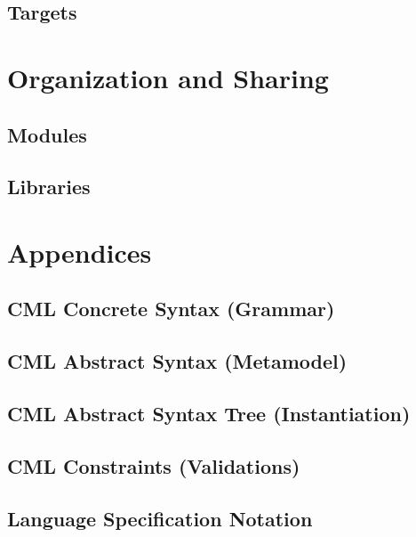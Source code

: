 \documentclass[a4paper,oneside,12pt, extrafontsizes]{memoir}
\theoremstyle{definition}
\theoremstyle{definition}
\theoremstyle{definition}
\theoremstyle{definition}
\begin{document}
\chapter{Targets}
\label{sec:targets}

\part{Organization and Sharing}

\chapter{Modules}
\label{ch:modules}

\chapter{Libraries}
\label{ch:libraries}

\part{Appendices}

\appendix

\chapter{CML Concrete Syntax (Grammar)}
\label{apx:concrete-syntax}


\chapter{CML Abstract Syntax (Metamodel)}
\label{apx:abstract-syntax}


\chapter{CML Abstract Syntax Tree (Instantiation)}
\label{apx:ast}


\chapter{CML Constraints (Validations)}
\label{apx:ocl}


\chapter{Language Specification Notation}
\label{apx:lsl}


\backmatter



\end{document}
